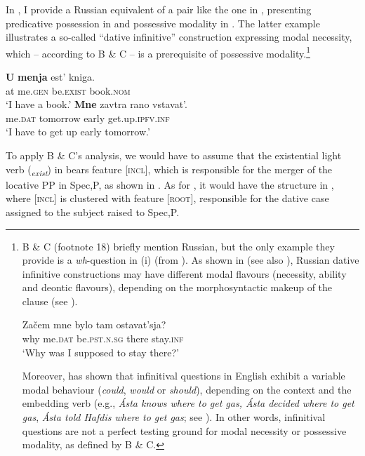 \documentclass[output=paper,colorlinks,citecolor=brown,modfonts,nonflat]{langsci/langscibook}
\begin{document}
In , I provide a Russian equivalent of a pair like the one in , presenting predicative possession in  and possessive modality in . The latter example illustrates a so-called “dative infinitive” construction expressing modal necessity, which – according to B \& C – is a prerequisite of possessive modality.\footnote{B \& C (footnote 18) briefly mention Russian, but the only example they provide is a \textit{wh}{}-question in (i) (from \citealt[105]{Jung2011}). As shown in \citet{Tsedryk2018} (see also \citealt{Fortuin2007}), Russian dative infinitive constructions may have different modal flavours (necessity, ability and deontic flavours), depending on the morphosyntactic makeup of the clause (see ).

\ea%
    \gll    Začem  mne       bylo          tam     ostavat’sja?\\
            why     me.\textsc{dat}   be.\textsc{pst.n.sg}  there   stay.\textsc{inf}\\
    \glt    ‘Why was I supposed to stay there?’      
\z    

Moreover, \citet[ch. 4]{Bhatt2006} has shown that infinitival questions in English exhibit a variable modal behaviour (\textit{could}, \textit{would} or \textit{should}), depending on the context and the embedding verb (e.g., \textit{Ásta knows where to get gas, Ásta decided where to get gas}, \textit{Ásta told Hafdis where to get gas}; see \citealt[124]{Bhatt2006}). In other words, infinitival questions are not a perfect testing ground for modal necessity or possessive modality, as defined by B \& C.} 

\ea%
    \label{ex:tsedryk:6}
    \ea\label{ex:tsedryk:6a}
    \gll    \textbf{U}  \textbf{menja}     {est’}           {kniga}.\\
            at  me.\textsc{gen}   be.\textsc{exist}    book.\textsc{nom}\\
    \glt    ‘I have a book.’
    \ex\label{ex:tsedryk:6b}
    \gll    \textbf{{Mne}}      {zavtra}       {rano}   {vstavat’}.\\
            me.\textsc{dat}  tomorrow  early  get.up.\textsc{ipfv.inf}\\
    \glt    ‘I have to get up early tomorrow.’ \hfill \citep[ex. (20a)]{Tsedryk2018}  
    \z
\z

To apply B \& C’s analysis, we would have to assume that the existential light verb (\liv \textit{\textsubscript{exist}}) in  bears feature [\textsc{incl}], which is responsible for the merger of the locative PP in Spec,\liv P, as shown in . As for , it would have the structure in , where [\textsc{incl}] is clustered with feature [\textsc{root}], responsible for the dative case assigned to the subject raised to Spec,\liv P.
\end{document}

